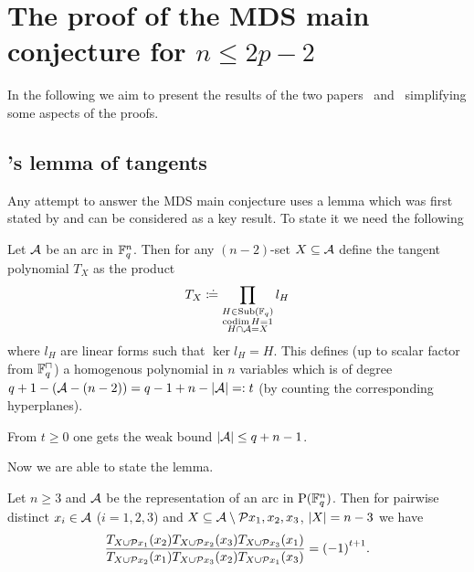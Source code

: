 \section{The proof of the MDS main conjecture for $n\leq 2p-2$}\label{sec-msd-nleq2p-2}

In the following we aim to present the results of the two papers~\cite{ball2011mdsmainconjI} and~\cite{ball2012mdsmainconjII} simplifying some aspects of the proofs.

\subsection{'s lemma of tangents}%

Any attempt to answer the MDS main conjecture uses a lemma which was first stated by  and can be considered as a key result. To state it we need the following

\begin{definition}
    Let $\mathcal{A}$ be an arc in $\mathbb{F}_{q}^n$. Then for any $(n-2)$-set $X\subseteq \mathcal{A}$ define the tangent polynomial $T_X$ as the product
    $$
    T_X\mathrel{\mathrel{\mathop:}\mkern-1.2mu\doteq}\prod_{\substack{H\in\mathop\mathrm{Sub}\nolimits(\mathbb{F}_{q})\\ \mathop\mathrm{codim}{H}=1\\ H\cap\mathcal{A}=X}}{l_H}
    $$
    where $l_H$ are linear forms such that $\ker{l_H}=H$. This defines (up to scalar factor from $\units{\field{q}}$) a homogenous polynomial in $n$ variables which is of degree $q+1-(\mathcal{A}-(n-2))=q-1+n-\left|\mathcal{A}\right|=:t$ (by counting the corresponding hyperplanes).
\end{definition}

\begin{remark}
    From $t\geq 0$ one gets the weak bound $\left|\mathcal{A}\right|\leq q+n-1$.
\end{remark}

Now we are able to state the lemma.

\begin{lemma}
  Let $n\geq3$ and $\mathcal{A}$ be the representation of an arc in $\P(\field{q}^n)$. Then for pairwise distinct $x_i\in \mathcal{A}$ ($i=1,2,3$) and $X\setleq \cA\setminus\set{x_1,x_2,x_3}$, $\left|X\right|=n-3$ we have
  $$    \frac{T_{X\setjoin\set{x_1}}(x_2)T_{X\setjoin\set{x_2}}(x_3)T_{X\setjoin\set{x_3}}(x_1)}{T_{X\setjoin\set{x_2}}(x_1)T_{X\setjoin\set{x_3}}(x_2)T_{X\setjoin\set{x_1}}(x_3)}={(-1)}^{t+1}.
  $$
\end{lemma}

